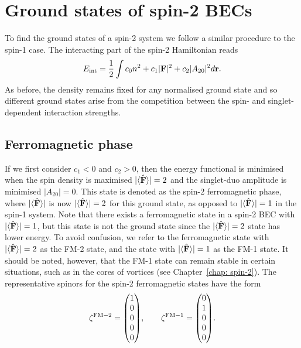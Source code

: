 \section{Ground states of spin-2 BECs}\label{sec: ground-states-spin-2}
To find the ground states of a spin-2 system we follow a similar procedure to
the spin-1 case.
The interacting part of the spin-2 Hamiltonian reads
\begin{align}
    E_\mathrm{int} = \frac{1}{2}\int c_0n^2 + c_1|\vb{F}|^2+c_2|A_{20}|^2
    d\vb{r}.
\end{align}
As before, the density remains fixed for any normalised ground state and so
different ground states arise from the competition between the spin-
and singlet-dependent interaction strengths.

\subsection{Ferromagnetic phase}
If we first consider \(c_1 < 0\) and \(c_2 > 0\), then the energy functional is
minimised when  the spin density is maximised \(|\langle \hat{\vb{F}} \rangle |=2\)
and the singlet-duo amplitude is minimised \(|A_{20}|=0\).
This state is denoted as the spin-2 ferromagnetic phase, where \(|\langle \hat{\vb{F}} \rangle | \) is
now \(|\langle \hat{\vb{F}} \rangle |=2\) for this ground state, as opposed to \(|\langle \hat{\vb{F}} \rangle |=1\) in the
spin-1 system.
Note that there exists a ferromagnetic state in a spin-2 BEC with
\(|\langle \hat{\vb{F}} \rangle |=1\), but this state is not the ground state since the \(|\langle \hat{\vb{F}} \rangle |=2\)
state has lower energy.
To avoid confusion, we refer to the ferromagnetic state with \(|\langle \hat{\vb{F}} \rangle |=2\) as
the FM-2 state, and the state with \(|\langle \hat{\vb{F}} \rangle |=1\) as the FM-1 state.
It should be noted, however, that the FM-1 state can remain stable in
certain situations, such as in the cores of vortices (see
Chapter~\ref{chap: spin-2}).
The representative spinors for the spin-2 ferromagnetic states have the form
\begin{equation}\label{eq: FM2-FM1-spinors}
    \zeta^\mathrm{FM-2} = \mqty(1 \\ 0 \\ 0 \\ 0 \\ 0), \qquad
    \zeta^\mathrm{FM-1} = \mqty(0 \\ 1 \\ 0 \\ 0 \\ 0).
\end{equation}

